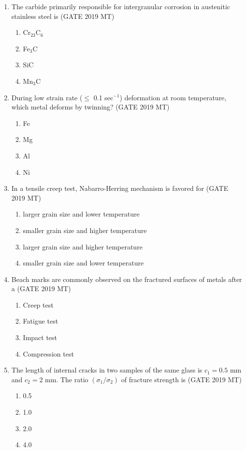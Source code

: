 \documentclass[12pt]{article}
\begin{document}
\begin{enumerate}
\item The carbide primarily responsible for intergranular corrosion in austenitic stainless steel is \hspace{1em} (GATE 2019 MT)
\begin{enumerate}[label=(\alph*)]
    \item Cr$_{23}$C$_6$
    \item Fe$_3$C
    \item SiC
    \item Mn$_3$C
\end{enumerate}

\item During low strain rate ($\leq$ 0.1 sec$^{-1}$) deformation at room temperature, which metal deforms by twinning? (GATE 2019 MT)
\begin{enumerate}[label=(\alph*)]
    \item Fe
    \item Mg
    \item Al
    \item Ni
\end{enumerate}

\item In a tensile creep test, Nabarro-Herring mechanism is favored for \hspace{1em} (GATE 2019 MT)
\begin{enumerate}[label=(\alph*)]
    \item larger grain size and lower temperature
    \item smaller grain size and higher temperature
    \item larger grain size and higher temperature
    \item smaller grain size and lower temperature
\end{enumerate}

\item Beach marks are commonly observed on the fractured surfaces of metals after a \hspace{1em} (GATE 2019 MT)
\begin{enumerate}[label=(\alph*)]
    \item Creep test
    \item Fatigue test
    \item Impact test
    \item Compression test
\end{enumerate}

\item The length of internal cracks in two samples of the same glass is $c_1 = 0.5$ mm and $c_2 = 2$ mm. The ratio $(\sigma_1 / \sigma_2)$ of fracture strength is \hspace{1em} (GATE 2019 MT)
\begin{enumerate}[label=(\alph*)]
    \item 0.5
    \item 1.0
    \item 2.0
    \item 4.0
\end{enumerate}


\end{enumerate}
\end{document}
